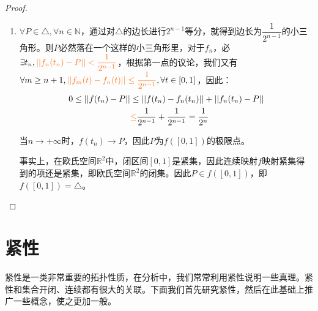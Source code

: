 \documentclass[lang=cn,10pt,device=pad]{elegantbook}
\newcommand{\tl}[1]{\textcolor{myor}{#1}}
\begin{document}
\begin{example}[Peano曲线]
\begin{proof}
\begin{enumerate}
			\item $\forall P	\in \triangle ,\forall n\in \mathbb{N}$，通过对$\triangle$的边长进行$2^{n-1}$等分，就得到边长为$\dfrac{1}{2^{n-1}}$的小三角形。则$P$必然落在一个这样的小三角形里，对于$f_n$，必$\exists t_{n},\tl{||f_{n}(t_{n})-P||<\dfrac{1}{2^{n-1}}}$，根据第一点的议论，我们又有$\forall m\geq n+1, \tl{||f_{m}(t) - f_{n}(t)||\leq \dfrac{1}{2^{n-1}}} , \forall t\in [0,1]$，因此：
			\begin{equation*}
				\begin{aligned}
					0\leq ||f(t_{n})-P||&\leq ||f(t_{n})-f_{n}(t_{n})||+||f_{n}(t_{n})-P||\\
					 &\tl{\leq} \dfrac{1}{2^{n-1}}+\dfrac{1}{2^{n-1}} = \dfrac{1}{2^{n}}
				\end{aligned}
			\end{equation*}
			
			当$n\to +\infty$时，$f(t_{n}) \rightarrow P$，因此$P$为$f([0,1])$的极限点。
			
			事实上，\textcolor{myblu}{在欧氏空间$\mathbb{R}^{2}$中，闭区间$[0,1]$是紧集，因此连续映射$f$映射紧集得到的项还是紧集，即欧氏空间$\mathbb{R}^{2}$的闭集。}因此$P\in f([0,1])$，即$f([0,1]) = \triangle$。
		\end{enumerate}
	\end{proof}
\end{example}

\chapter{紧性}
紧性是一类非常重要的拓扑性质，在分析中，我们常常利用紧性说明一些真理。紧性和集合开闭、连续都有很大的关联。下面我们首先研究紧性，然后在此基础上推广一些概念，使之更加一般。
\end{document}
